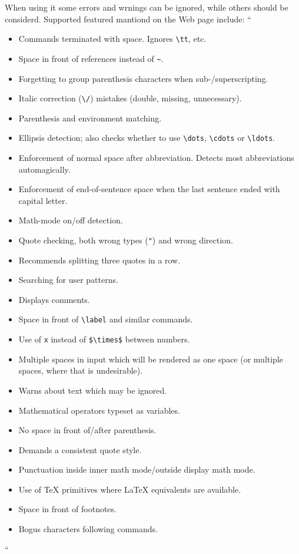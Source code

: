 When using it some errors and wrnings can be ignored, while others
should be considerd. Supported featured mantiond on the Web page
include:
``
\begin{itemize}
          \item  Commands terminated with space. Ignores \verb|\tt|, etc.
          \item  Space in front of references instead of \verb|~|.
          \item  Forgetting to group parenthesis characters when
            sub-/superscripting.
          \item  Italic correction (\verb|\/|) mistakes (double, missing,
            unnecessary).
          \item  Parenthesis and environment matching.
          \item  Ellipsis detection; also checks whether to use \verb|\dots|,
            \verb|\cdots| or \verb|\ldots|.
          \item  Enforcement of normal space after abbreviation. Detects most
            abbreviations automagically.
          \item  Enforcement of end-of-sentence space when the last sentence
            ended with capital letter.
          \item  Math-mode on/off detection.
          \item  Quote checking, both wrong types (\verb|"|) and wrong direction.
          \item  Recommends splitting three quotes in a row.
          \item  Searching for user patterns.
          \item  Displays comments.
          \item  Space in front of \verb|\label| and similar commands.
          \item  Use of \verb|x| instead of \verb|$\times$| between numbers.
          \item  Multiple spaces in input which will be rendered as one space
            (or multiple spaces, where that is undesirable).
          \item  Warns about text which may be ignored.
          \item  Mathematical operators typeset as variables.
          \item  No space in front of/after parenthesis.
          \item  Demands a consistent quote style.
          \item  Punctuation inside inner math mode/outside display math mode.
          \item  Use of TeX primitives where LaTeX equivalents are available.
          \item  Space in front of footnotes.
          \item  Bogus characters following commands.
\end{itemize}
``

